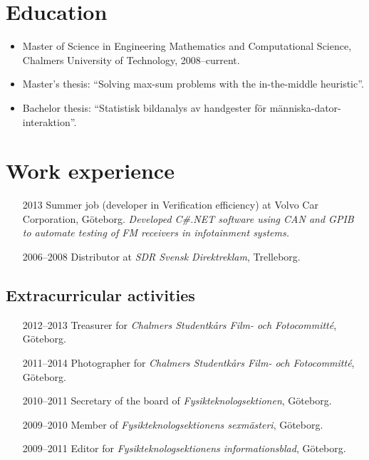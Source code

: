 \documentclass{skvitae}
\begin{document}
	\RaggedRight
	\maketitle


	\section{Education}
	\begin{itemize}
		\item Master of Science in Engineering Mathematics and Computational Science, Chalmers University of Technology, 2008--current.%
		\item {Master's thesis: \enquote{Solving max-sum problems with the in-the-middle heuristic}}.%
		\item {Bachelor thesis: \foreignquote{swedish}{Statistisk bildanalys av handgester för människa-dator-interaktion}}.
	\end{itemize}

	\section{Work experience}
	\begin{itemize}
		\item[2013] Summer job (developer in Verification efficiency) at Volvo Car Corporation, Göteborg. %
		    \textit{Developed C\#.NET software using CAN and GPIB to automate testing of FM receivers in infotainment systems.}
		\item[2006--2008] Distributor at \emph{SDR Svensk Direktreklam}, Trelleborg.
	\end{itemize}

	\medskip
	\subsection{Extracurricular activities}
	\begin{itemize}
		\item[2012--2013] Treasurer for \emph{Chalmers Studentkårs Film- och Fotocommitté}, Göteborg.
		\item[2011--2014] Photographer for \emph{Chalmers Studentkårs Film- och Fotocommitté}, Göteborg.
		\item[2010--2011] Secretary of the board of \emph{Fysikteknologsektionen}, Göteborg.
		\item[2009--2010] Member of \emph{Fysikteknologsektionens sexmästeri}, Göteborg.
		\item[2009--2011] Editor for \emph{Fysikteknologsektionens informationsblad}, Göteborg.
	\end{itemize}
\end{document}
